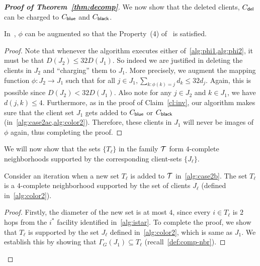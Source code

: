 \begin{proof}[{\bf Proof of Theorem~\ref{thm:decomp}}]
We now show that the deleted clients, $C_{\mathsf{del}}$ can be charged to $C_{\mathsf{blue}}$ and $C_{\mathsf{black}}$. 
\begin{claim} \label{cl:phi-augment}
In~, $\phi$ can be augmented so that the Property~(4) of~ is satisfied.
\end{claim}
\begin{proof}
Note that whenever the algorithm executes either of~\cref{alg:phi1,alg:phi2}, it must be that $D(J_2) \leq 32 D(J_1)$. So indeed we are justified in deleting the clients in $J_2$ and ``charging'' them to $J_1$. More precisely, we augment the
mapping function $\phi:J_2 \to J_1$ such that for all $j\in J_1, \sum_{k:\phi(k) = j} d_k \leq 32d_j$. Again, this is possible since $D(J_2) < 32D(J_1)$. Also note for any $j\in J_2$ and $k\in J_1$,
we have $d(j,k) \leq 4$.
Furthermore, as in the proof of Claim~\ref{cl:inv}, our algorithm makes sure that the client set $J_1$ gets added to $C_{\mathsf{blue}}$ or $C_{\mathsf{black}}$ (in~\cref{alg:case2ac,alg:color2}). 
Therefore, these clients in $J_1$ will never be images of $\phi$ again, thus completing the proof.
\end{proof}


We will now show that the sets $\{T_\ell\}$ in the family ${\cal T}$ form $4$-complete neighborhoods supported by the corresponding client-sets $\{J_\ell\}$.
\begin{lemma} \label{lem:local}
Consider an iteration when a new set $T_\ell$ is added to ${\cal T}$ in~\cref{alg:case2b}. The set $T_\ell$ is a $4$-complete neighborhood supported by the set of clients $J_\ell$ (defined in~\cref{alg:color2}).
\end{lemma}

\begin{proof}
Firstly, the diameter of the new set is at most $4$, since every $i \in T_\ell$ is $2$ hops from the $i^*$ facility identified in~\cref{alg:istar}. To complete the proof, we show that $T_\ell$ is supported by the set $J_\ell$ defined in~\cref{alg:color2}, which is same as $J_1$. %
We establish this by showing that $\Gamma_G(J_1) \subseteq T_\ell$ (recall~\cref{def:comp-nbr}).


\end{proof}
\end{proof}
